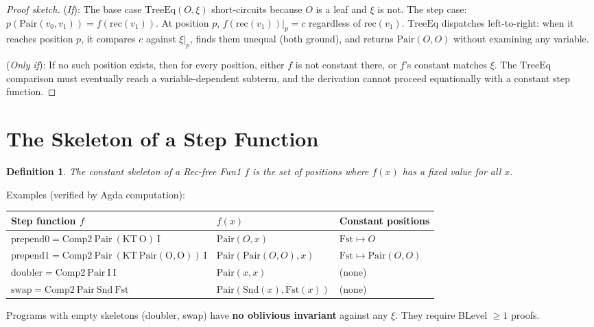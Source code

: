 \documentclass[11pt]{article}
\newtheorem{definition}[theorem]{Definition}
\begin{document}
\begin{proof}[Proof sketch]
(\emph{If}): The base case $\mathrm{TreeEq}(O, \xi)$ short-circuits because $O$ is a leaf
and $\xi$ is not. The step case: $p(\mathrm{Pair}(v_0, v_1)) = f(\mathrm{rec}(v_1))$.
At position $p$, $f(\mathrm{rec}(v_1))|_p = c$ regardless of $\mathrm{rec}(v_1)$.
$\mathrm{TreeEq}$ dispatches left-to-right: when it reaches position $p$,
it compares $c$ against $\xi|_p$, finds them unequal (both ground), and returns
$\mathrm{Pair}(O,O)$ without examining any variable.

(\emph{Only if}): If no such position exists, then for every position,
either $f$ is not constant there, or $f$'s constant matches $\xi$.
The $\mathrm{TreeEq}$ comparison must eventually reach a variable-dependent
subterm, and the derivation cannot proceed equationally with a constant step function.
\end{proof}

\section{The Skeleton of a Step Function}

\begin{definition}
The \emph{constant skeleton} of a Rec-free Fun1 $f$ is the set of positions
where $f(x)$ has a fixed value for all $x$.
\end{definition}

Examples (verified by Agda computation):
\begin{center}
\begin{tabular}{lll}
\hline
Step function $f$ & $f(x)$ & Constant positions \\
\hline
$\mathrm{prepend0} = \mathrm{Comp2\ Pair\ (KT\ O)\ I}$ & $\mathrm{Pair}(O, x)$ & $\mathrm{Fst} \mapsto O$ \\
$\mathrm{prepend1} = \mathrm{Comp2\ Pair\ (KT\ Pair(O,O))\ I}$ & $\mathrm{Pair}(\mathrm{Pair}(O,O), x)$ & $\mathrm{Fst} \mapsto \mathrm{Pair}(O,O)$ \\
$\mathrm{doubler} = \mathrm{Comp2\ Pair\ I\ I}$ & $\mathrm{Pair}(x, x)$ & (none) \\
$\mathrm{swap} = \mathrm{Comp2\ Pair\ Snd\ Fst}$ & $\mathrm{Pair}(\mathrm{Snd}(x), \mathrm{Fst}(x))$ & (none) \\
\hline
\end{tabular}
\end{center}

Programs with empty skeletons (doubler, swap) have \textbf{no oblivious invariant}
against any $\xi$. They require BLevel $\geq 1$ proofs.
\end{document}
